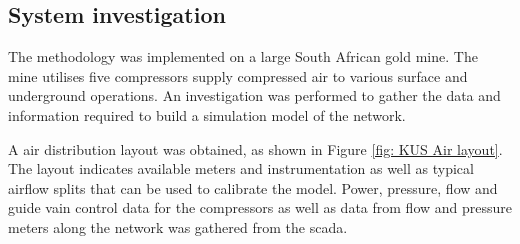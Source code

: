 	\subsection{System investigation}
	The methodology was implemented on a large South African gold mine. The mine utilises five compressors supply compressed air to various surface and underground operations. An investigation was performed to gather the data and information required to build a simulation model of the network.
	\par 
	A air distribution layout was obtained, as shown in Figure \ref{fig: KUS Air layout}. The layout indicates available meters and instrumentation as well as typical airflow splits that can be used to calibrate the model. Power, pressure, flow  and guide vain control data for the compressors as well as data from flow and pressure meters along the network was gathered from the \gls{scada}.
